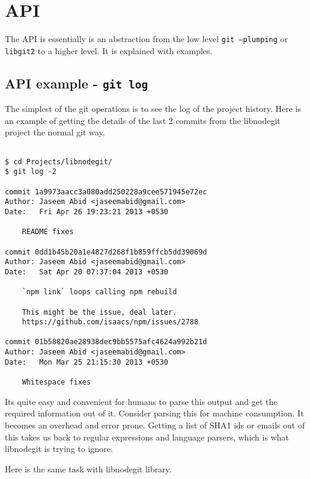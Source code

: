 \section{API}

The API is essentially is an abstraction from the low level \texttt{git
  --plumping} or \texttt{libgit2} to a higher level. It is explained with
examples.

\subsection{API example - \texttt{git log}}

The simplest of the git operations is to see the log of the project history.
Here is an example of getting the details of the last 2 commits from the
libnodegit project the normal git way.

\begin{verbatim}

$ cd Projects/libnodegit/
$ git log -2

commit 1a9973aacc3a080add250228a9cee571945e72ec
Author: Jaseem Abid <jaseemabid@gmail.com>
Date:   Fri Apr 26 19:23:21 2013 +0530

    README fixes

commit 0dd1b45b20a1e4827d268f1b859ffcb5dd39069d
Author: Jaseem Abid <jaseemabid@gmail.com>
Date:   Sat Apr 20 07:37:04 2013 +0530

    `npm link` loops calling npm rebuild

    This might be the issue, deal later.
    https://github.com/isaacs/npm/issues/2788

commit 01b58820ae28938dec9bb5575afc4624a992b21d
Author: Jaseem Abid <jaseemabid@gmail.com>
Date:   Mon Mar 25 21:15:30 2013 +0530

    Whitespace fixes

\end{verbatim}

Its quite easy and convenient for humans to parse this output and get the
required information out of it. Consider parsing this for machine consumption.
It becomes an overhead and error prone. Getting a list of SHA1 ids or emails out
of this takes us back to regular expressions and language parsers, which is what
libnodegit is trying to ignore.

Here is the same task with libnodegit library.

